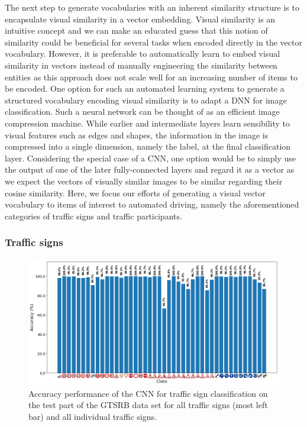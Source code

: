 The next step to generate vocabularies with an inherent similarity structure is to encapsulate visual similarity in a vector embedding.
Visual similarity is an intuitive concept and we can make an educated guess that this notion of similarity could be beneficial for several tasks when encoded directly in the vector vocabulary. 
However, it is preferable to automatically learn to embed visual similarity in vectors instead of manually engineering the similarity between entities as this approach does not scale well for an increasing number of items to be encoded.
One option for such an automated learning system to generate a structured vocabulary encoding visual similarity is to adapt a \acf{DNN} for image classification.
Such a neural network can be thought of as an efficient image compression machine.
While earlier and intermediate layers learn sensibility to visual features such as edges and shapes, the information in the image is compressed into a single dimension, namely the label, at the final classification layer.
Considering the special case of a \acf{CNN}, one option would be to simply use the output of one of the later fully-connected layers and regard it as a vector as we expect the vectors of visually similar images to be similar regarding their cosine similarity.
Here, we focus our efforts of generating a visual vector vocabulary to items of interest to automated driving, namely the aforementioned categories of traffic signs and traffic participants.

\subsubsection{Traffic signs}%
\label{ssubsec:traffic_signs}

\begin{figure}[t]
    \centering
    \includegraphics[width=0.9\linewidth]{imgs/CNN_GTSRB_performance_plot.png}
    \caption{Accuracy performance of the \ac{CNN} for traffic sign classification on the test part of the \ac{GTSRB} data set for all traffic signs (most left bar) and all individual traffic signs.}
    \label{fig:CNN_GTSRB_performance_plot}
\end{figure}

